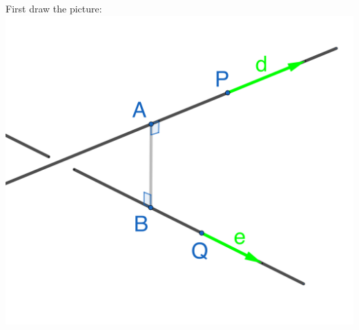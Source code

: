 \documentclass{article}
\begin{document}
\begin{Answer}
First draw the picture:\\

\includegraphics[scale=0.3]{skew-lines.png}


\end{Answer}
\end{document}

